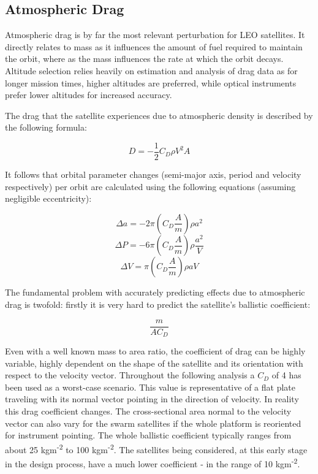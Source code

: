 \subsection{Atmospheric Drag}
\label{mtrAtmDrag}
Atmospheric drag is by far the most relevant perturbation for \ac{LEO} satellites. It directly relates to mass as it influences the amount of fuel required to maintain the orbit, where as the mass influences the rate at which the orbit decays. Altitude selection relies heavily on estimation and analysis of drag data as for longer mission times, higher altitudes are preferred, while optical instruments prefer lower altitudes for increased accuracy.

The drag that the satellite experiences due to atmospheric density is described by the following formula:

\begin{equation}
D = -\frac{1}{2} C_D \rho V^2A
\label{drag}
\end{equation}

It follows that orbital parameter changes (semi-major axis, period and velocity respectively) per orbit are calculated using the following equations (assuming negligible eccentricity):

\begin{equation}
\Delta a = -2 \pi \left( C_D \frac{A}{m} \right) \rho a^2
\label{deltaSMA}
\end{equation}
\begin{equation}
\Delta P = -6 \pi \left( C_D \frac{A}{m} \right) \rho \frac{a^2}{V}
\label{deltaP}
\end{equation}
\begin{equation}
\Delta V = \pi \left( C_D \frac{A}{m} \right) \rho aV
\label{deltaV}
\end{equation}

The fundamental problem with accurately predicting effects due to atmospheric drag is twofold: firstly it is very hard to predict the satellite's ballistic coefficient:

\begin{equation}
\frac{m}{AC_D}
\label{ball}
\end{equation}

Even with a well known mass to area ratio, the coefficient of drag can be highly variable, highly dependent on the shape of the satellite and its orientation with respect to the velocity vector. Throughout the following analysis a $C_D$ of 4 has been used as a worst-case scenario. This value is representative of a flat plate traveling with its normal vector pointing in the direction of velocity. In reality this drag coefficient changes. The cross-sectional area normal to the velocity vector can also vary for the swarm satellites if the whole platform is reoriented for instrument pointing. The whole ballistic coefficient typically ranges from about 25 kgm\textsuperscript{-2} to 100 kgm\textsuperscript{-2}. The satellites being considered, at this early stage in the design process, have a much lower coefficient - in the range of 10 kgm\textsuperscript{-2}.

